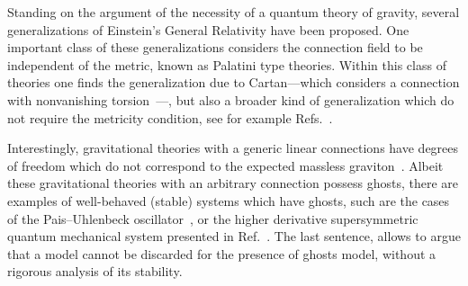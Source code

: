 \documentclass[aps,prd,12pt,twocolumn,superscriptaddress,showpacs,showkeys,reprint%
]{revtex4-1}
\renewcommand{\(}{\left(}
\renewcommand{\)}{\right)}
\renewcommand{\[}{\left[}
\renewcommand{\]}{\right]}
\begin{document}

Standing on the argument of the necessity of a quantum theory of gravity, several generalizations of Einstein's General Relativity have been proposed. One important class of these generalizations considers the connection field to be independent of the metric, known as Palatini type theories. Within this class of theories one finds the generalization due to Cartan---which considers a connection with nonvanishing torsion~\cite{Cartan1922,Cartan1923,Cartan1924,Cartan1925}---, but also a broader kind of generalization which do not require the metricity condition, see for example Refs.~\cite{Hehl:1976kj,Hehl:1994ue,Pagani:2015ema}.

Interestingly, gravitational theories with a generic linear connections have degrees of freedom which do not correspond to the expected massless graviton~\cite{Sezgin:1979zf}. Albeit these gravitational theories with an arbitrary connection possess ghosts, there are examples of well-behaved (stable) systems which have ghosts, such are the cases of the Pais--Uhlenbeck oscillator~\cite{Mannheim:2004qz,Bender:2007wu,Smilga:2008pr,Ilhan:2013xe}, or the higher derivative supersymmetric quantum mechanical system presented in Ref.~\cite{Robert:2008}. The last sentence, allows to argue that a model cannot be discarded  for the presence of ghosts model, without a rigorous analysis of its stability.
\end{document}
